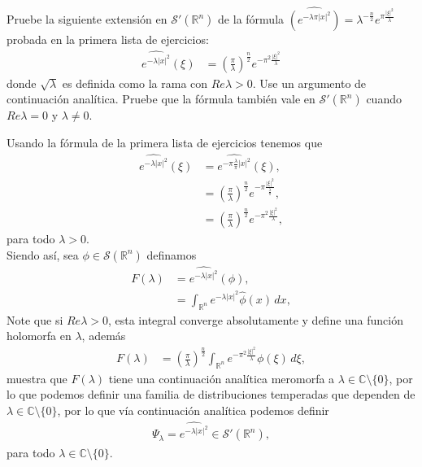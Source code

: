 \begin{homeworkProblem}
  Pruebe la siguiente extensión en $\mathcal{S}'(\mathbb{R}^{n})$ de la fórmula $\hat{(e^{-\lambda\pi|x|^2})}=\lambda^{-\frac{n}{2}}e^{\pi\frac{|\xi|^2}{\lambda}}$ probada en la primera lista de ejercicios:
  \begin{align*}
    \hat{e^{-\lambda|x|^2}}(\xi)&=\left( \frac{\pi}{\lambda} \right)^{\frac{n}{2}}e^{-\pi^{2}\frac{|\xi|^2}{\lambda}}
  \end{align*}
  donde $\sqrt{\lambda}$ es definida como la rama con $Re \lambda>0$. Use un argumento de continuación analítica. Pruebe que la fórmula también vale en $\mathcal{S}'(\mathbb{R}^{n})$ cuando $Re \lambda=0$ y $\lambda\neq 0$. 
  \begin{solution}
    Usando la fórmula de la primera lista de ejercicios tenemos que
    \begin{align*}
      \hat{e^{-\lambda |x|^2}}(\xi)&=\hat{e^{-\pi \frac{\lambda}{\pi}|x|^2}}(\xi),\\
      &=\left( \frac{\pi}{\lambda} \right)^{\frac{n}{2}}e^{-\pi\frac{|\xi|^2}{\frac{\lambda}{\pi}}},\\
      &=\left( \frac{\pi}{\lambda} \right)^{\frac{n}{2}}e^{-\pi^2\frac{|\xi|^2}{\lambda}}, 
    \end{align*}
    para todo $\lambda>0$.\\
    Siendo así, sea $\phi\in\mathcal{S}(\mathbb{R}^{n})$ definamos
    \begin{align*}
      F(\lambda)&=\hat{e^{-\lambda|x|^2}}(\phi),\\
      &=\int_{\mathbb{R}^{n}}e^{-\lambda|x|^2}\hat{\phi}(x)\, dx,
    \end{align*}
    Note que si $Re \lambda>0$, esta integral converge absolutamente y define una función holomorfa en $\lambda$, además
    \begin{align*}
      F(\lambda)&=\left( \frac{\pi}{\lambda} \right)^{\frac{n}{2}}\int_{\mathbb{R}^{n}}e^{-\pi^2\frac{|\xi|^2}{\lambda}}\phi(\xi)\, d\xi,
    \end{align*}
    muestra que $F(\lambda)$ tiene una continuación analítica meromorfa a $\lambda\in \mathbb{C}\setminus\{0\}$, por lo que podemos definir una familia de distribuciones temperadas que dependen de $\lambda\in\mathbb{C}\setminus\{0\}$, por lo que vía continuación analítica podemos definir
    \begin{align*}
      \Psi_{\lambda}=\hat{e^{-\lambda|x|^2}}\in\mathcal{S}'(\mathbb{R}^{n}),
    \end{align*}
    para todo $\lambda\in\mathbb{C}\setminus\{0\}$.\\

\end{solution}
\end{homeworkProblem}
